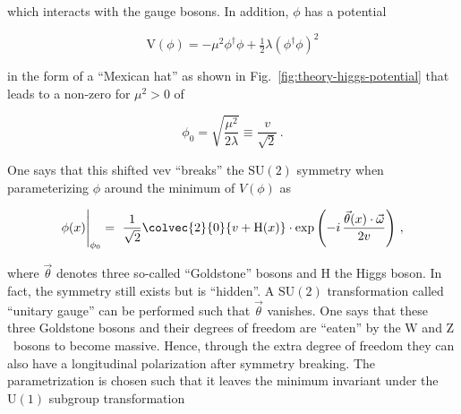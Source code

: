 which interacts with the gauge bosons. In addition, $\phi$ has a potential 

\begin{equation}
\mathrm{V}(\phi)=-\mu^2\phi^\dagger\phi+\tfrac{1}{2}\lambda(\phi^\dagger\phi)^2
\end{equation}

in the form of a ``Mexican hat'' as shown in Fig.~\ref{fig:theory-higgs-potential} that leads to a non-zero  for $\mu^2>0$ of 

\begin{equation}
\phi_0=\sqrt{\frac{\mu^{2}}{2\lambda}}\equiv \frac{v}{\sqrt{2}}\,.
\end{equation}


One says that this shifted \gls{vev} ``breaks'' the $\mathrm{SU(2)}$ symmetry when parameterizing $\phi$ around the minimum of $V(\phi)$ as

\begin{equation}
\phi(x) \Bigg|_{\phi_0} =~\frac{1}{\sqrt{2}}\colvec{2}{0}{v+\mathrm{H}(x)}\cdot \exp\left(-i\,\frac{\vec{\theta}(x)\cdot\vec{\omega}}{2v}\right)\,, \label{eq:theory-phi-dev}
\end{equation}

where $\vec{\theta}$ denotes three so-called ``Goldstone'' bosons and $\mathrm{H}$ the Higgs boson. In fact, the symmetry still exists but is ``hidden''. A $\mathrm{SU(2)}$ transformation called ``unitary gauge'' can be performed such that $\vec{\theta}$ vanishes. One says that these three Goldstone bosons and their degrees of freedom are ``eaten'' by the $\mathrm{W}$ and $\mathrm{Z}$~bosons to become massive. Hence, through the extra degree of freedom they can also have a longitudinal polarization after symmetry breaking. The parametrization is chosen such that it leaves the minimum invariant under the $\mathrm{U(1)}$ subgroup transformation

